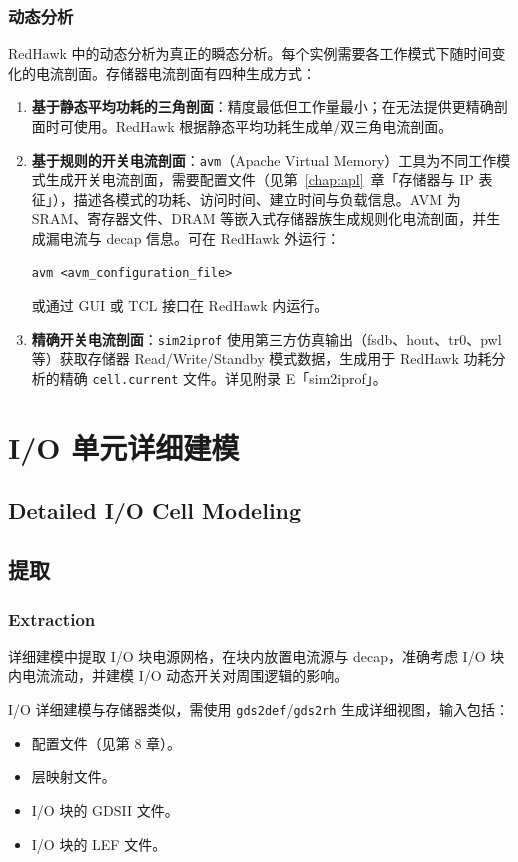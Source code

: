 \subsubsection{动态分析}
RedHawk 中的动态分析为真正的瞬态分析。每个实例需要各工作模式下随时间变化的电流剖面。存储器电流剖面有四种生成方式：
\begin{enumerate}
  \item \textbf{基于静态平均功耗的三角剖面}：精度最低但工作量最小；在无法提供更精确剖面时可使用。RedHawk 根据静态平均功耗生成单/双三角电流剖面。
  \item \textbf{基于规则的开关电流剖面}：\texttt{avm}（Apache Virtual Memory）工具为不同工作模式生成开关电流剖面，需要配置文件（见第~\ref{chap:apl}~章「存储器与 IP 表征」），描述各模式的功耗、访问时间、建立时间与负载信息。AVM 为 SRAM、寄存器文件、DRAM 等嵌入式存储器族生成规则化电流剖面，并生成漏电流与 decap 信息。可在 RedHawk 外运行：
\begin{lstlisting}
avm <avm_configuration_file>
\end{lstlisting}
  或通过 GUI 或 TCL 接口在 RedHawk 内运行。
  \item \textbf{精确开关电流剖面}：\texttt{sim2iprof} 使用第三方仿真输出（fsdb、hout、tr0、pwl 等）获取存储器 Read/Write/Standby 模式数据，生成用于 RedHawk 功耗分析的精确 \texttt{cell.current} 文件。详见附录 E「sim2iprof」。
\end{enumerate}

\section{I/O 单元详细建模}
\subsection*{Detailed I/O Cell Modeling}

\subsection{提取}
\subsubsection*{Extraction}

详细建模中提取 I/O 块电源网格，在块内放置电流源与 decap，准确考虑 I/O 块内电流流动，并建模 I/O 动态开关对周围逻辑的影响。

I/O 详细建模与存储器类似，需使用 \texttt{gds2def}/\texttt{gds2rh} 生成详细视图，输入包括：
\begin{itemize}
  \item 配置文件（见第 8 章）。
  \item 层映射文件。
  \item I/O 块的 GDSII 文件。
  \item I/O 块的 LEF 文件。
\end{itemize}

